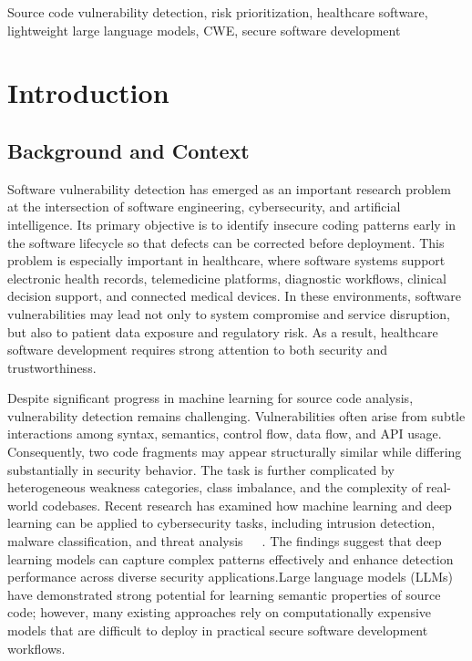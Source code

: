 \documentclass[conference]{IEEEtran}
\begin{document}
\begin{IEEEkeywords}
Source code vulnerability detection, risk prioritization, healthcare software, lightweight large language models, CWE, secure software development
\end{IEEEkeywords}

\section{Introduction}

\subsection{Background and Context}
Software vulnerability detection has emerged as an important research problem at the intersection of software engineering, cybersecurity, and artificial intelligence. Its primary objective is to identify insecure coding patterns early in the software lifecycle so that defects can be corrected before deployment. This problem is especially important in healthcare, where software systems support electronic health records, telemedicine platforms, diagnostic workflows, clinical decision support, and connected medical devices. In these environments, software vulnerabilities may lead not only to system compromise and service disruption, but also to patient data exposure and regulatory risk. As a result, healthcare software development requires strong attention to both security and trustworthiness.

Despite significant progress in machine learning for source code analysis, vulnerability detection remains challenging. Vulnerabilities often arise from subtle interactions among syntax, semantics, control flow, data flow, and API usage. Consequently, two code fragments may appear structurally similar while differing substantially in security behavior. The task is further complicated by heterogeneous weakness categories, class imbalance, and the complexity of real-world codebases. Recent research has examined how machine learning and deep learning can be applied to cybersecurity tasks, including intrusion detection, malware classification, and threat analysis~\cite{vinayakumar2019ml}~\cite{vinayakumar2019ids}~\cite{babu2018review}. The findings suggest that deep learning models can capture complex patterns effectively and enhance detection performance across diverse security applications.Large language models (LLMs) have demonstrated strong potential for learning semantic properties of source code; however, many existing approaches rely on computationally expensive models that are difficult to deploy in practical secure software development workflows.
\end{document}
